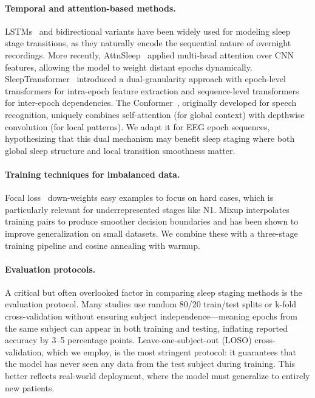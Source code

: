 \documentclass[final]{article}
\begin{document}
\paragraph{Temporal and attention-based methods.}
LSTMs~\cite{Hochreiter1997} and bidirectional variants have been widely used for modeling sleep stage transitions, as they naturally encode the sequential nature of overnight recordings. More recently, AttnSleep~\cite{Eldele2021} applied multi-head attention over CNN features, allowing the model to weight distant epochs dynamically. SleepTransformer~\cite{Phan2022} introduced a dual-granularity approach with epoch-level transformers for intra-epoch feature extraction and sequence-level transformers for inter-epoch dependencies. The Conformer~\cite{Gulati2020}, originally developed for speech recognition, uniquely combines self-attention (for global context) with depthwise convolution (for local patterns). We adapt it for EEG epoch sequences, hypothesizing that this dual mechanism may benefit sleep staging where both global sleep structure and local transition smoothness matter.

\paragraph{Training techniques for imbalanced data.}
Focal loss~\cite{Lin2017} down-weights easy examples to focus on hard cases, which is particularly relevant for underrepresented stages like N1. Mixup interpolates training pairs to produce smoother decision boundaries and has been shown to improve generalization on small datasets. We combine these with a three-stage training pipeline and cosine annealing with warmup.

\paragraph{Evaluation protocols.}
A critical but often overlooked factor in comparing sleep staging methods is the evaluation protocol. Many studies use random 80/20 train/test splits or k-fold cross-validation without ensuring subject independence---meaning epochs from the same subject can appear in both training and testing, inflating reported accuracy by 3--5 percentage points. Leave-one-subject-out (LOSO) cross-validation, which we employ, is the most stringent protocol: it guarantees that the model has never seen any data from the test subject during training. This better reflects real-world deployment, where the model must generalize to entirely new patients.
\end{document}
